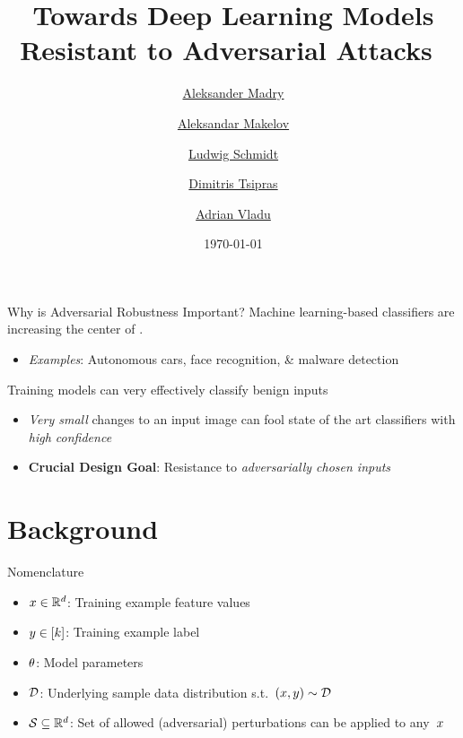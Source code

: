 \documentclass[11pt,dvipsnames,usenames,aspectratio=169]{beamer}  %
\title[Towards Deep Robustness]{Towards Deep Learning Models Resistant to Adversarial Attacks~\cite{Madry:2017}}
\author[Madry et al]{%
  \href{mailto:madry@mit.edu}{Aleksander Madry}\inst{1}  %
  \and
  \href{mailto:amakelov@mit.edu}{Aleksandar Makelov}\inst{1}  %
  \and
  \href{mailto:ludwigs@mit.edu}{Ludwig Schmidt}\inst{1}  %
  \and
  \href{mailto:tsipras@mit.edu}{Dimitris Tsipras}\inst{1}  %
  \and
  \href{mailto:avladu@mit.edu}{Adrian Vladu}\inst{1}  %
}
\institute[MIT]{%
  \textsuperscript{1}\textbf{MIT -- CSAIL}\\
}
\date{\today}
\renewcommand{\green}[1]{{\color{ForestGreen} #1}}
\begin{document}
\begin{frame}
  \titlepage
\end{frame}

\begin{frame}{Why is Adversarial Robustness Important?}
  Machine learning-based classifiers are increasing the center of .
  \begin{itemize}
    \item \textit{Examples}: Autonomous cars, face recognition, \& malware detection
  \end{itemize}
  \vfill
  Training models can very effectively classify \green{benign} inputs
  \begin{itemize}
    \item \textit{Very small} changes to an input image can fool state of the art classifiers with \textit{high confidence}
    \item \textbf{Crucial Design Goal}: Resistance to \textit{adversarially chosen inputs}
  \end{itemize}
\end{frame}

\section{Background}


\begin{frame}{Nomenclature}
  \begin{itemize}
    \item ${x \in \mathbb{R}^{d}}$: Training example feature values
    \item ${y \in \lbrack k\rbrack}$: Training example label

    \item $\theta$: Model parameters

    \item $\mathcal{D}$: Underlying sample data distribution s.t.\ ${(x,y) \sim \mathcal{D}}$
    \item ${\mathcal{S} \subseteq \mathbb{R}^d}$: Set of allowed (adversarial) perturbations can be applied to any~$x$
  \end{itemize}
\end{frame}
\end{document}
